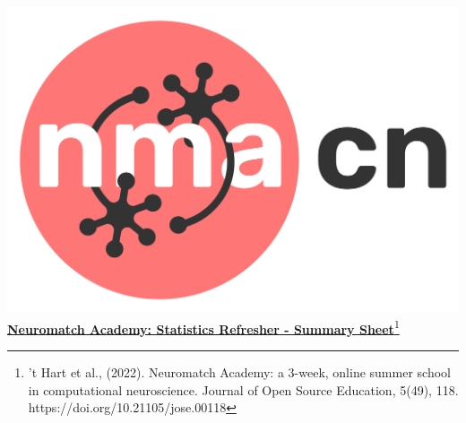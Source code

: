 

\newpage
\clearpage
\includegraphics[scale=0.03]{Figures/NMACN.png}\href{https://compneuro.neuromatch.io/tutorials/intro.html}{\textbf{\Huge{Neuromatch Academy: Statistics Refresher - Summary Sheet}}\footnote{’t Hart et al., (2022). Neuromatch Academy: a 3-week, online summer school in computational neuroscience. Journal of Open Source Education, 5(49), 118. https://doi.org/10.21105/jose.00118}}

